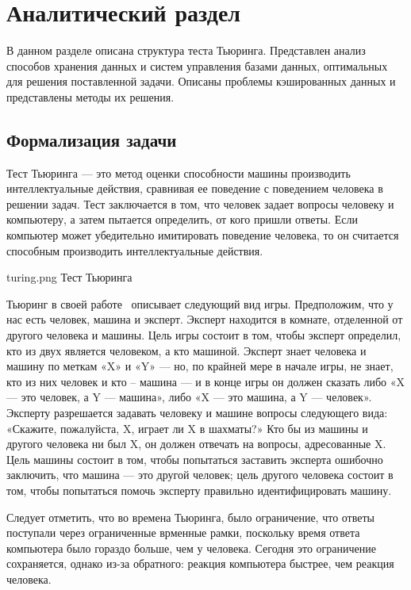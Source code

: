 \section{Аналитический раздел}

В данном разделе описана структура теста Тьюринга.  
Представлен анализ способов хранения данных и систем управления базами данных, оптимальных для решения поставленной задачи. Описаны  
проблемы кэшированных данных и представлены методы их решения.

\subsection{Формализация задачи}
Тест Тьюринга --- это метод оценки способности машины производить интеллектуальные действия, сравнивая ее поведение с поведением человека в решении задач. Тест заключается в том, что человек задает вопросы человеку и компьютеру, а затем пытается определить, от кого пришли ответы. Если компьютер может убедительно имитировать поведение человека, то он считается способным производить интеллектуальные действия.

\img{100mm}
{turing.png}
{Тест Тьюринга}

Тьюринг в своей работе~\cite{10.1093/mind/LIX.236.433} описывает следующий вид игры. Предположим, что у нас есть человек, машина и эксперт. Эксперт находится в комнате, отделенной от другого человека и машины. Цель игры состоит в том, чтобы эксперт определил, кто из двух является человеком, а кто машиной. Эксперт знает человека и машину по меткам «X» и «Y» --- но, по крайней мере в начале игры, не знает, кто из них человек и кто -- машина --- и в конце игры он должен сказать либо «X --- это человек, а Y --- машина», либо «X --- это машина, а Y --- человек».
Эксперту разрешается задавать человеку и машине вопросы следующего вида: «Скажите, пожалуйста, X, играет ли X в шахматы?» Кто бы из машины и другого человека ни был X, он должен отвечать на вопросы, адресованные X. Цель машины состоит в том, чтобы попытаться заставить эксперта ошибочно заключить, что машина --- это другой человек; цель другого человека состоит в том, чтобы попытаться помочь эксперту правильно идентифицировать машину.~\cite{sep-turing-test}

Следует отметить, что во времена Тьюринга, было ограничение, что ответы поступали через ограниченные врменные рамки, поскольку время ответа компьютера было гораздо больше, чем у человека. 
Сегодня это ограничение сохраняется, однако из-за обратного: реакция компьютера быстрее, чем реакция человека.

